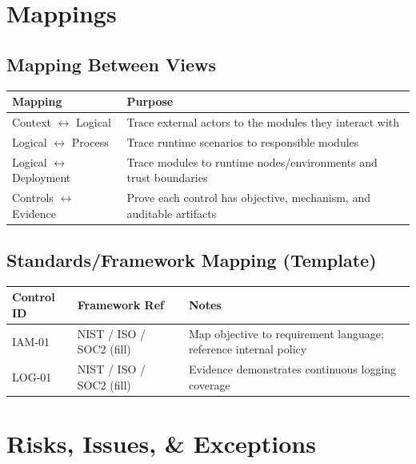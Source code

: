 \documentclass[11pt]{report}
\begin{document}
\section{Mappings}
\subsection{Mapping Between Views}
\begin{tabularx}{\textwidth}{@{}l >{\raggedright\arraybackslash}X@{}}
\toprule
\textbf{Mapping} & \textbf{Purpose} \\
\midrule
Context $\leftrightarrow$ Logical & Trace external actors to the modules they interact with \\
Logical $\leftrightarrow$ Process & Trace runtime scenarios to responsible modules \\
Logical $\leftrightarrow$ Deployment & Trace modules to runtime nodes/environments and trust boundaries \\
Controls $\leftrightarrow$ Evidence & Prove each control has objective, mechanism, and auditable artifacts \\
\bottomrule
\end{tabularx}

\subsection{Standards/Framework Mapping (Template)}
\begin{tabularx}{\textwidth}{@{}l l >{\raggedright\arraybackslash}X@{}}
\toprule
\textbf{Control ID} & \textbf{Framework Ref} & \textbf{Notes} \\
\midrule
IAM-01 & NIST / ISO / SOC2 (fill) & Map objective to requirement language; reference internal policy \\
LOG-01 & NIST / ISO / SOC2 (fill) & Evidence demonstrates continuous logging coverage \\
\bottomrule
\end{tabularx}

\section{Risks, Issues, \& Exceptions}
\end{document}
